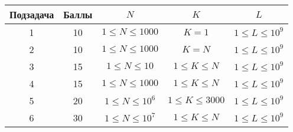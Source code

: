 \begin{center}
\begin{tabular}{ |c|c|c|c|c| }
\hline
Подзадача & Баллы & $N$ & $K$ & $L$\\
\hline
1 & 10 & $1 \le N \le 1000$ & $K = 1$ & $1 \le L \le 10^9$\\
\hline
2 & 10 & $1 \le N \le 1000$ & $K = N$ & $1 \le L \le 10^9$\\
\hline
3 & 15 & $1 \le N \le 10$ & $1 \le K \le N$ & $1 \le L \le 10^9$\\
\hline
4 & 15 & $1 \le N \le 1000$ & $1 \le K \le N$ & $1 \le L \le 10^9$\\
\hline
5 & 20 & $1 \le N \le 10^6$ & $1\le K \le 3000$ & $1 \le L \le 10^9$\\
\hline
6 & 30 & $1 \le N \le 10^7$ & $1 \le K \le N$ & $1 \le L \le 10^9$\\
\hline
\end{tabular}
\end{center}
